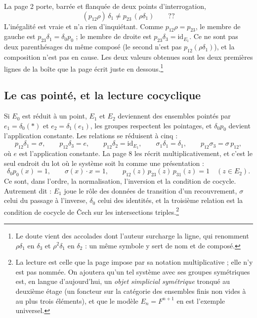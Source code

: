\documentclass[11pt,a4paper]{article}
\begin{document}
La page 2 porte, barrée et flanquée de deux points d'interrogation,
\[
  (p_{12}\rho)\,\delta_{1} \neq p_{23}\,(\rho\delta_{1}) \qquad ??
\]
L'inégalité est vraie et n'a rien d'inquiétant. Comme $p_{12}\rho = p_{23}$, le
membre de gauche est $p_{23}\delta_{1} = \delta_{0}p_{0}$ ; le membre de droite
est $p_{23}\delta_{3} = \mathrm{id}_{E_{1}}$. Ce ne sont pas deux
parenthésages du même composé (le second n'est pas
$p_{12}(\rho\delta_{1})$), et la composition n'est pas en cause. Les deux
valeurs obtenues sont les deux premières lignes de la boîte que la
page écrit juste en dessous.\footnote{Le doute vient des accolades dont l'auteur
surcharge la ligne, qui renomment $\rho\delta_{1}$ en $\delta_{3}$ et
$\rho^{2}\delta_{1}$ en $\delta_{2}$ : un même symbole y sert de nom et de
composé.}

\subsection*{Le cas pointé, et la lecture cocyclique}

Si $E_{0}$ est réduit à un point, $E_{1}$ et $E_{2}$ deviennent des ensembles
pointés par $e_{1} = \delta_{0}(*)$ et $e_{2} = \delta_{1}(e_{1})$, les groupes
respectent les pointages, et $\delta_{0}p_{0}$ devient l'application constante.
Les relations se réduisent à cinq :
\[
  p_{12}\delta_{1} = \sigma, \qquad
  p_{12}\delta_{3} = e, \qquad
  p_{12}\delta_{2} = \mathrm{id}_{E_{1}}, \qquad
  \sigma_{1}\delta_{1} = \delta_{1}, \qquad
  p_{12}\sigma_{3} = \sigma\,p_{12},
\]
où $e$ est l'application constante. La page 8 les récrit multiplicativement,
et c'est le seul endroit du lot où le système soit lu comme une présentation :
\[
  \delta_{0}p_{0}(x) = 1, \qquad
  \sigma(x)\cdot x = 1, \qquad
  p_{12}(z)\,p_{23}(z)\,p_{31}(z) = 1 \quad (z \in E_{2}).
\]
Ce sont, dans l'ordre, la normalisation, l'inversion et la condition de
cocycle. Autrement dit : $E_{1}$ joue le rôle des données de transition d'un
recouvrement, $\sigma$ celui du passage à l'inverse, $\delta_{0}$ celui des
identités, et la troisième relation est la condition de cocycle de Čech sur les
intersections triples.\footnote{La lecture est celle que la page impose par sa
notation multiplicative ; elle n'y est pas nommée. On ajoutera qu'un tel système
avec ses groupes symétriques est, en langue d'aujourd'hui, un \emph{objet
simplicial symétrique} tronqué au deuxième étage (un foncteur sur la catégorie
des ensembles finis non vides à au plus trois éléments), et que le modèle
$E_{n} = F^{n+1}$ en est l'exemple universel.}
\end{document}
